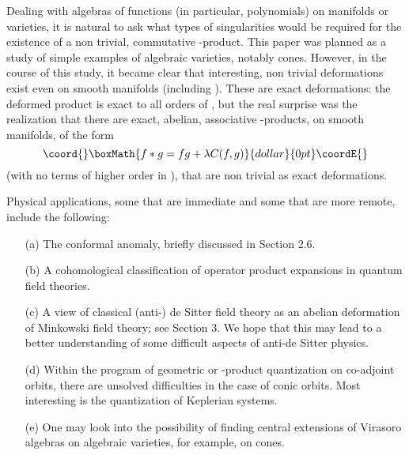 \documentclass[a4paper,a4paper]{article}
\begin{document}
Dealing with algebras of functions (in particular, polynomials)
on manifolds or varieties, %
it is natural to ask what types of singularities would be required for
the existence of a non trivial, commutative \myHighlight{$*$}\coordHE{}-product.  
This paper was planned as a study of simple examples of 
algebraic varieties, notably cones.
However, in the course of this study, it became clear that interesting, 
non trivial deformations exist even on smooth manifolds (including
\coordHE{}). These are exact deformations: the deformed product is exact
to all orders of \myHighlight{$\lambda$}\coordHE{}, but the real surprise was the realization that
there are exact, abelian, associative \myHighlight{$*$}\coordHE{}-products, on smooth manifolds, 
of the form
$$\coord{}\boxMath{
f*g = fg + \lambda C(f,g)
}{dollar}{0pt}\coordE{}$$ 
(with no terms of higher order in \myHighlight{$\lambda$}\coordHE{}),  that are non trivial
as exact deformations.

\smallskip

Physical applications, some that are immediate and some that are more
remote, include the following:
\begin{itemize}
\item[(a)] The conformal anomaly, briefly discussed in Section 2.6.
\vspace*{-2.2mm}

\item[(b)] A cohomological classification of operator product expansions
in quantum field theories.
\vspace*{-2.2mm}

\item[(c)] A view of classical (anti-) de Sitter field theory as an abelian
deformation of Min\-kowski field theory; see Section 3.  We hope that this
may lead to a better understanding of some difficult aspects of anti-de
Sitter physics.
\vspace*{-2.2mm}

\item[(d)] Within the program of geometric  or \myHighlight{$*$}\coordHE{}-product quantization on
co-adjoint orbits, there are unsolved difficulties in the case of conic
orbits. Most interesting is the quantization of Keplerian systems.
\vspace*{-2.2mm}

\item[(e)] One may look into the possibility of finding central extensions of
Virasoro algebras on algebraic varieties,  for example, on cones.
\end{itemize}
\end{document}
